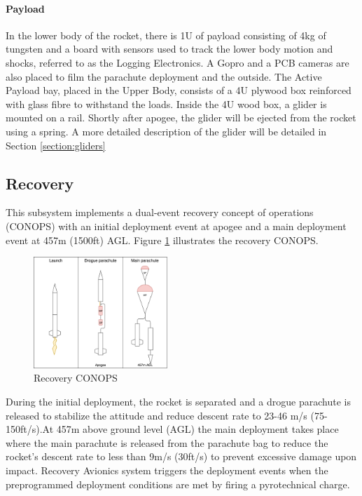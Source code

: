 \paragraph{Payload}
\hfill \break
In the lower body of the rocket, there is 1U of payload 
consisting of 4kg of tungsten and a board with sensors used to track the lower body motion and shocks, referred to as the Logging Electronics. A Gopro and a PCB cameras are also placed to film the parachute deployment and the outside.
The Active Payload bay, placed in the Upper Body, consists of a 4U plywood box reinforced with glass fibre to withstand the loads. Inside the 4U wood box, a glider is mounted on a rail. Shortly after apogee, the glider will be ejected from the rocket using a spring. A more detailed description of the glider will be detailed in Section \ref{section:gliders}




\subsection{Recovery}
This subsystem implements a dual-event recovery concept of operations (CONOPS) with an initial deployment event at apogee and a main deployment event at 457m (1500ft) AGL. Figure \ref{f:recovery_conops} illustrates the recovery CONOPS.
\begin{figure}[h!]
 	\centering
        \includegraphics[width=0.45\textwidth]{img/recovery_conops_schema.png}
        \caption{Recovery CONOPS}
        \label{f:recovery_conops}
 \end{figure}

During the initial deployment, the rocket is separated and a drogue parachute is released to stabilize the attitude and reduce descent rate to 23-46 m/s (75-150ft/s).At 457m above ground level (AGL) the main deployment takes place where the main parachute is released from the parachute bag to reduce the rocket's descent rate to less than 9m/s (30ft/s) to prevent excessive damage upon impact. Recovery Avionics system triggers the deployment events when the preprogrammed deployment conditions are met by firing a pyrotechnical charge.

